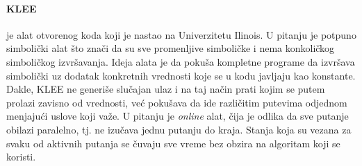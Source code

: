 \documentclass[12pt,oneside]{memoir}
\begin{document}
\paragraph{KLEE}\cite{klee} je alat otvorenog koda koji je nastao na Univerzitetu Ilinois. U pitanju je potpuno simbolički alat što znači da su sve promenljive simboličke i nema konkoličkog simboličkog izvršavanja. Ideja alata je da pokuša kompletne programe da izvršava simbolički uz dodatak konkretnih vrednosti koje se u kodu javljaju kao konstante. Dakle, KLEE ne generiše slučajan ulaz i na taj način prati kojim se putem prolazi zavisno od vrednosti, već pokušava da ide različitim putevima odjednom menjajući uslove koji važe. U pitanju je \textit{online} alat, čija je odlika da sve putanje obilazi paralelno, tj. ne izučava jednu putanju do kraja. Stanja koja su vezana za svaku od aktivnih putanja se čuvaju sve vreme bez obzira na algoritam koji se koristi.
\end{document}
